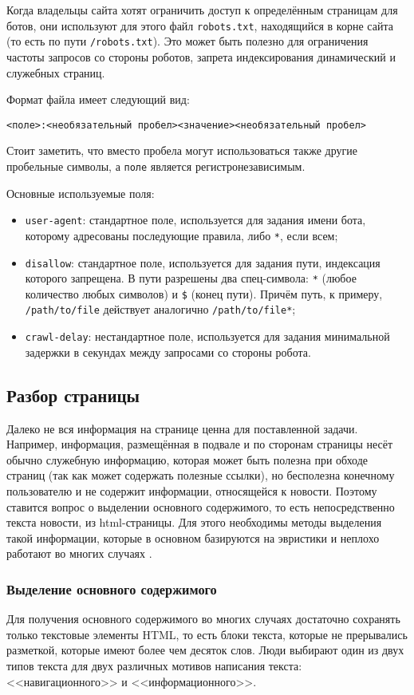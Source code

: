Когда владельцы сайта хотят ограничить доступ к определённым страницам для ботов, они используют для этого файл \verb|robots.txt|, находящийся в корне сайта (то есть по пути \verb|/robots.txt|). Это может быть полезно для ограничения частоты запросов со стороны роботов, запрета индексирования динамический и служебных страниц.

Формат файла имеет следующий вид:
\begin{verbatim}
<поле>:<необязательный пробел><значение><необязательный пробел>
\end{verbatim}

Стоит заметить, что вместо пробела могут использоваться также другие пробельные символы, а \verb|поле| является регистронезависимым.

Основные используемые поля:
\begin{itemize}
    \item \verb|user-agent|: стандартное поле, используется для задания имени бота, которому адресованы последующие правила, либо \verb|*|, если всем;
    \item \verb|disallow|: стандартное поле, используется для задания пути, индексация которого запрещена. В пути разрешены два спец-символа: \verb|*| (любое количество любых символов) и \verb|$| (конец пути). Причём путь, к примеру, \verb|/path/to/file| действует аналогично \verb|/path/to/file*|;
    \item \verb|crawl-delay|: нестандартное поле, используется для задания минимальной задержки в секундах между запросами со стороны робота.
\end{itemize}

\subsection{Разбор страницы}
Далеко не вся информация на странице ценна для поставленной задачи. Например, информация, размещённая в подвале и по сторонам страницы несёт обычно служебную информацию, которая может быть полезна при обходе страниц (так как может содержать полезные ссылки), но бесполезна конечному пользователю и не содержит информации, относящейся к новости. Поэтому ставится вопрос о выделении основного содержимого, то есть непосредственно текста новости, из html-страницы. Для этого необходимы методы выделения такой информации, которые в основном базируются на эвристики и неплохо работают во многих случаях \cite{pomikalek11}.

\subsubsection{Выделение основного содержимого} \label{sssec:readability}
Для получения основного содержимого во многих случаях достаточно сохранять только текстовые элементы HTML, то есть блоки текста, которые не прерывались разметкой, которые имеют более чем десяток слов. Люди выбирают один из двух типов текста для двух различных мотивов написания текста: <<навигационного>> и <<информационного>>.

